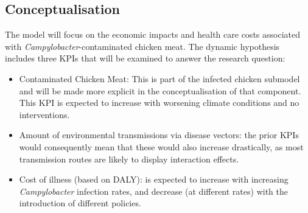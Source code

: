 \subsection{Conceptualisation}
\label{s:conceptualisation}
The model will focus on the economic impacts and health care costs associated with \textit{Campylobacter}-contaminated chicken meat. The dynamic hypothesis includes three KPIs that will be examined to answer the research question: 
\begin{itemize}
    \item Contaminated Chicken Meat: This is part of the infected chicken submodel and will be made more explicit in the conceptualisation of that component. This KPI is expected to increase with worsening climate conditions and no interventions.
    \item Amount of environmental transmissions via disease vectors: the prior KPIs would consequently mean that these would also increase drastically, as most transmission routes are likely to display interaction effects.
    \item Cost of illness (based on DALY): is expected to increase with increasing \textit{Campylobacter} infection rates, and decrease (at different rates) with the introduction of different policies.
\end{itemize}
 
